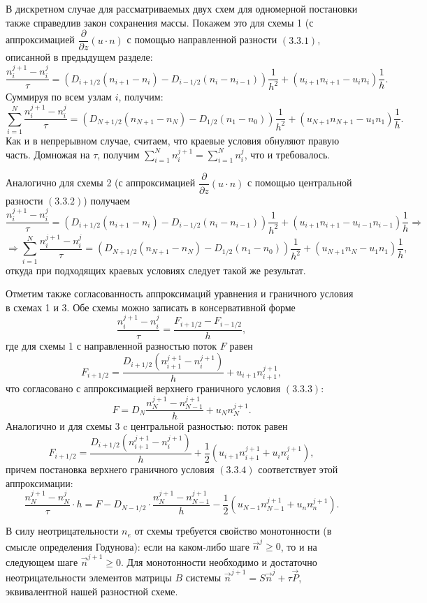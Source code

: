 \documentclass[14pt, a4paper, fleqn]{extarticle}
\renewcommand{\geq}{\geqslant}
\begin{document}
В дискретном случае для рассматриваемых двух схем для одномерной постановки также справедлив закон сохранения массы. Покажем это для схемы 1 (с аппроксимацией $\dfrac{\partial}{\partial z}(u\cdot n)$ с помощью направленной разности $(3.3.1)$, описанной в предыдущем разделе: $$\dfrac{n_i^{j+1}-n_i^j}{\tau} = (D_{i+1/2}(n_{i+1}-n_i)-D_{i-1/2}(n_i-n_{i-1}))\dfrac{1}{h^2}+(u_{i+1}n_{i+1}-u_i n_i)\dfrac{1}{h}.$$
Суммируя по всем узлам $i$, получим: $$\displaystyle\sum_{i=1}^{N} \dfrac{n_i^{j+1}-n_i^j}{\tau} = (D_{N+1/2}(n_{N+1}-n_{N})-D_{1/2}(n_1-n_0))\dfrac{1}{h^2}+(u_{N+1}n_{N+1}-u_1 n_1)\dfrac{1}{h}.$$
Как и в непрерывном случае, считаем, что краевые условия обнуляют правую часть. Домножая на $\tau$, получим $\displaystyle\sum_{i=1}^{N} n_i^{j+1}=\displaystyle\sum_{i=1}^{N} n_i^j$, что и требовалось.

Аналогично для схемы 2 (с аппроксимацией $\dfrac{\partial}{\partial z}(u\cdot n)$ с помощью центральной разности $(3.3.2)$) получаем $$\dfrac{n_i^{j+1}-n_i^j}{\tau} = (D_{i+1/2}(n_{i+1}-n_i)-D_{i-1/2}(n_i-n_{i-1}))\dfrac{1}{h^2}+(u_{i+1}n_{i+1}-u_{i-1} n_{i-1})\dfrac{1}{h}\Rightarrow$$ $$\Rightarrow \displaystyle\sum_{i=1}^{N} \dfrac{n_i^{j+1}-n_i^j}{\tau} = (D_{N+1/2}(n_{N+1}-n_{N})-D_{1/2}(n_1-n_0))\dfrac{1}{h^2}+(u_{N+1}n_{N}-u_1 n_1)\dfrac{1}{h},$$ откуда при подходящих краевых условиях следует такой же результат.

\bigskip

Отметим также согласованность аппроксимаций уравнения и граничного условия в схемах 1 и 3. Обе схемы можно записать в консервативной форме $$\dfrac{n_i^{j+1}-n_i^j}{\tau} = \dfrac{F_{i+1/2}-F_{i-1/2}}{h},$$ где для схемы 1 с направленной разностью поток $F$ равен $$F_{i+1/2} = \dfrac{D_{i+1/2}(n_{i+1}^{j+1}-n_i^{j+1})}{h}+u_{i+1}n_{i+1}^{j+1},$$ что согласовано с аппроксимацией верхнего граничного условия $(3.3.3)$: $$F = D_N\dfrac{n_N^{j+1}-n_{N-1}^{j+1}}{h}+u_Nn_N^{j+1}.$$
Аналогично и для схемы 3 c центральной разностью: поток равен $$F_{i+1/2} = \dfrac{D_{i+1/2}(n_{i+1}^{j+1}-n_i^{j+1})}{h}+\dfrac{1}{2}(u_{i+1}n_{i+1}^{j+1}+u_in_i^{j+1}),$$ причем постановка верхнего граничного условия $(3.3.4)$ соответствует этой аппроксимации: $$\dfrac{n_N^{j+1}-n_N^{j}}{\tau}\cdot h = F - D_{N-1/2}\cdot\dfrac{n_N^{j+1}-n_{N-1}^{j+1}}{h}-\dfrac{1}{2}(u_{N-1}n_{N-1}^{j+1}+u_nn_n^{j+1}).$$

\bigskip

В силу неотрицательности $n_e$ от схемы требуется свойство монотонности (в смысле определения Годунова): если на каком-либо шаге $\vec{n}^j \geq 0$, то и на следующем шаге $\vec{n}^{j+1}\geq 0$. Для монотонности необходимо и достаточно неотрицательности элементов матрицы $B$ системы $\vec{n}^{j+1}=S\vec{n}^j + \tau \vec{P}$, эквивалентной нашей разностной схеме.
\end{document}
